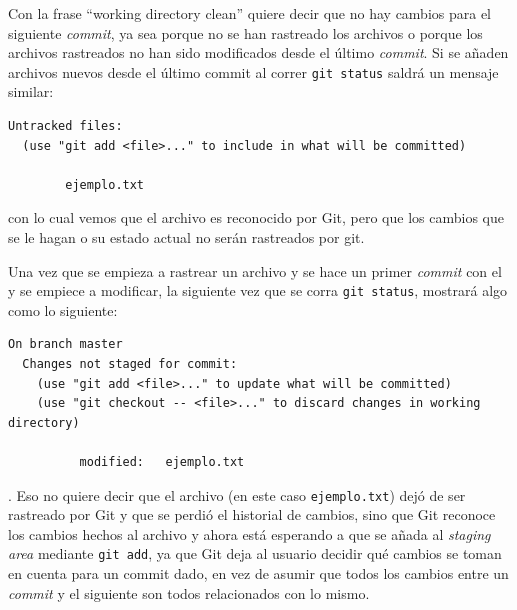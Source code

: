\documentclass[spanish, 12pt, a4paper]{article}
\begin{document}
Con la frase ``working directory clean'' quiere decir que no hay cambios para el siguiente \textit{commit}, ya sea porque no se han rastreado los archivos o porque los archivos rastreados no han sido modificados desde el último \textit{commit}.
Si se añaden archivos nuevos desde el último commit al correr \texttt{git status} saldrá un mensaje similar:
\begin{lstlisting}
Untracked files:
  (use "git add <file>..." to include in what will be committed)

        ejemplo.txt
\end{lstlisting}
con lo cual vemos que el archivo es reconocido por Git, pero que los cambios que se le hagan o su estado actual no serán rastreados por git.

Una vez que se empieza a rastrear un archivo y se hace un primer \textit{commit} con el y se empiece a modificar, la siguiente vez que se corra \texttt{git status}, mostrará algo como lo siguiente: 
\begin{lstlisting}
On branch master
  Changes not staged for commit:
    (use "git add <file>..." to update what will be committed)
    (use "git checkout -- <file>..." to discard changes in working directory)
  
          modified:   ejemplo.txt
\end{lstlisting}. 
Eso no quiere decir que el archivo (en este caso \texttt{ejemplo.txt}) dejó de ser rastreado por Git y que se perdió el historial de cambios, sino que Git reconoce los cambios hechos al archivo y ahora está esperando a que se añada al \textit{staging area} mediante \texttt{git add}, ya que Git deja al usuario decidir qué cambios se toman en cuenta para un commit dado, en vez de asumir que todos los cambios entre un \textit{commit} y el siguiente son todos relacionados con lo mismo.
\end{document}
